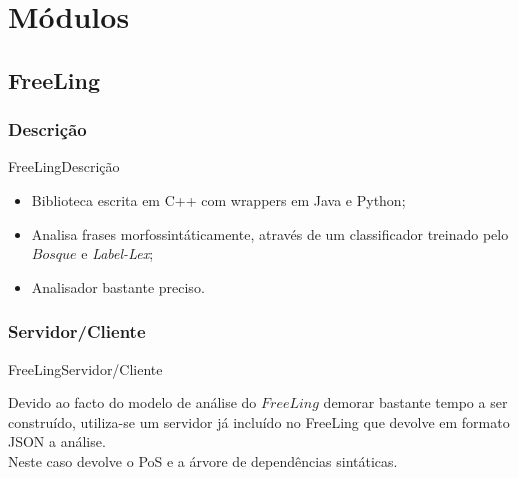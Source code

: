 \documentclass{beamer}
\begin{document}

\section{Módulos}

\subsection{FreeLing}

\subsubsection{Descrição}

\begin{frame}{FreeLing}{Descrição}

\begin{itemize}

\item Biblioteca escrita em C++ com wrappers em Java e Python; \\

\item Analisa frases morfossintáticamente, através de um classificador treinado pelo $Bosque$ e \textit{Label-Lex};

\item Analisador bastante preciso.

\end{itemize}

\end{frame}

\subsubsection{Servidor/Cliente}
\begin{frame}{FreeLing}{Servidor/Cliente}

\hspace{11pt} Devido ao facto do modelo de análise do $FreeLing$ demorar bastante tempo a ser construído, utiliza-se um servidor já incluído no FreeLing que devolve em formato JSON a análise. \\
\vspace{4mm}
\hspace{11pt} Neste caso devolve o PoS e a árvore de dependências sintáticas.

\end{frame}
\end{document}
